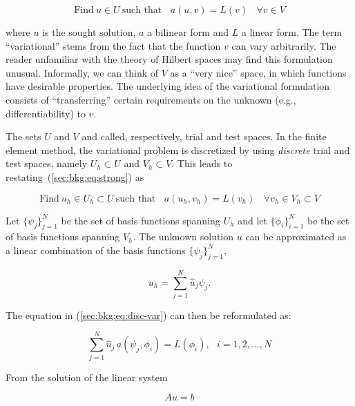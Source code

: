 \begin{equation}
\label{sec:bkg:eq:strong}
\text{Find}\ u \in U\ \text{such that}\ \ \ \ a(u, v) = L(v)\ \ \ \ \forall v \in V
\end{equation}

where $u$ is the sought solution, $a$ a bilinear form and $L$ a linear form. The term ``variational'' stems from the fact that the function $v$ can vary arbitrarily. The reader unfamiliar with the theory of Hilbert spaces may find this formulation unusual. Informally, we can think of $V$ as a ``very nice'' space, in which functions have desirable properties. The underlying idea of the variational formulation consists of ``transferring'' certain requirements on the unknown (e.g., differentiability) to $v$. 

The sets $U$ and $V$ and called, respectively, trial and test spaces. In the finite element method, the variational problem is discretized by using {\it discrete} trial and test spaces, namely $U_h \subset U$ and $V_h \subset V$. This leads to restating~(\ref{sec:bkg:eq:strong}) as

\begin{equation}
\label{sec:bkg:eq:disc-var}
\text{Find}\ u_h \in U_h \subset U\ \text{such that}\ \ \ \ a(u_h, v_h) = L(v_h)\ \ \ \ \forall v_h \in V_h \subset V
\end{equation}

Let $\lbrace \psi_j \rbrace_{j=1}^N$ be the set of basis functions spanning $U_h$ and let $\lbrace \phi_i \rbrace_{i=1}^{N}$ be the set of basis functions spanning $V_h$. The unknown solution $u$ can be approximated as a linear combination of the basis functions $\lbrace \psi_j \rbrace_{j=1}^N$,

\begin{equation}
u_h = \sum_{j=1}^N \hat{u}_j \psi_j.
\end{equation}

The equation in (\ref{sec:bkg:eq:disc-var}) can then be reformulated as:

\begin{equation}
\sum_{j=1}^N \hat{u}_j \, a(\psi_j, \phi_i) = L(\phi_i),\ \ \ i=1,2,...,N
\end{equation}

From the solution of the linear system

\begin{equation}
\label{sec:bkg:eq:lin-sys}
Au = b
\end{equation}


